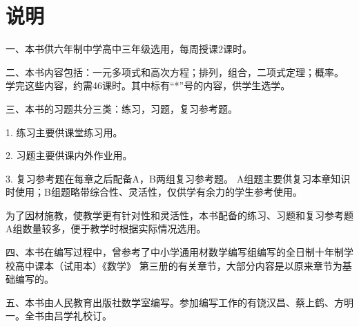 
\chapter{说明}

一、本书供六年制中学高中三年级选用，每周授课2课时。

二、本书内容包括：一元多项式和高次方程；排列，组合，二项式定理；概率。
学完这些内容，约需46课时。其中标有“*”号的内容，供学生选学。

三、本书的习题共分三类：练习，习题，复习参考题。

1. 练习\quad 主要供课堂练习用。

2. 习题\quad 主要供课内外作业用。

3. 复习参考题\quad 在每章之后配备A，B两组复习参考题。
A组题主要供复习本章知识时使用；B组题略带综合性、灵活性，仅供学有余力的学生参考使用。

为了因材施教，使教学更有针对性和灵活性，本书配备的练习、习题和复习参考题A组数量较多，便于教学时根据实际情况选用。

四、本书在编写过程中，曾参考了中小学通用材数学编写组编写的全日制十年制学校高中课本（试用本）《数学》
第三册的有关章节，大部分内容是以原来章节为基础编写的。

五、本书由人民教育出版社数学室编写。参加编写工作的有饶汉昌、蔡上鹤、方明一。全书由吕学礼校订。
